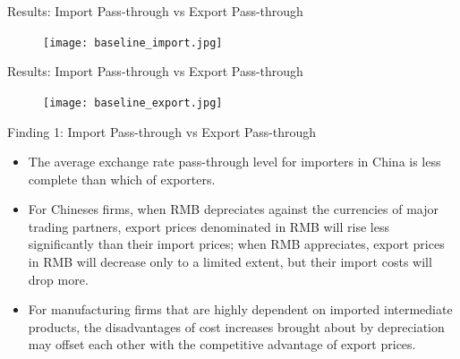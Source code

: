 \documentclass[10pt]{beamer}
\begin{document}
\begin{frame}{Results: Import Pass-through vs Export Pass-through}
	\begin{figure}[htbp]
		\centering
		\texttt{[image: baseline\_import.jpg]}
		\label{baseline.imp}
	\end{figure}
\end{frame}

\begin{frame}{Results: Import Pass-through vs Export Pass-through}
	\begin{figure}[htbp]
		\centering
		\texttt{[image: baseline\_export.jpg]}
		\label{baseline.exp}
	\end{figure}
\end{frame}

\begin{frame}{Finding 1: Import Pass-through vs Export Pass-through}
	\begin{tcolorbox}[colback=blue!5!white, colframe=blue!75!black,title=Key Finding 1]
		\begin{itemize}
			\item The average exchange rate pass-through level for importers in China is less complete than which of exporters.
		\end{itemize}
	\end{tcolorbox}
	\begin{itemize}
		\item For Chineses firms, when RMB depreciates against the currencies of major trading partners, export prices denominated in RMB will rise less significantly than their import prices; when RMB appreciates, export prices in RMB will decrease only to a limited extent, but their import costs will drop more.
		\item For manufacturing firms that are highly dependent on imported intermediate products, the disadvantages of cost increases brought about by depreciation may offset each other with the competitive advantage of export prices.
	\end{itemize}
\end{frame}
\end{document}
